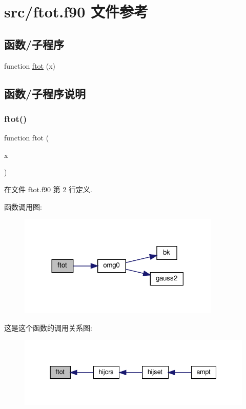 \hypertarget{ftot_8f90}{}\section{src/ftot.f90 文件参考}
\label{ftot_8f90}
\subsection*{函数/子程序}
\begin{DoxyCompactItemize}
\item 
function \mbox{\hyperlink{ftot_8f90_a0fceaf71610013119a7c4052e22d407b}{ftot}} (x)
\end{DoxyCompactItemize}


\subsection{函数/子程序说明}
\mbox{\label{ftot_8f90_a0fceaf71610013119a7c4052e22d407b}} 
\subsubsection{\texorpdfstring{ftot()}{ftot()}}
{\footnotesize\ttfamily function ftot (\begin{DoxyParamCaption}\item[{}]{x }\end{DoxyParamCaption})}



在文件 ftot.\+f90 第 2 行定义.

函数调用图\+:
\nopagebreak
\begin{figure}[H]
\begin{center}
\leavevmode
\includegraphics[width=272pt]{ftot_8f90_a0fceaf71610013119a7c4052e22d407b_cgraph}
\end{center}
\end{figure}
这是这个函数的调用关系图\+:
\nopagebreak
\begin{figure}[H]
\begin{center}
\leavevmode
\includegraphics[width=337pt]{ftot_8f90_a0fceaf71610013119a7c4052e22d407b_icgraph}
\end{center}
\end{figure}
